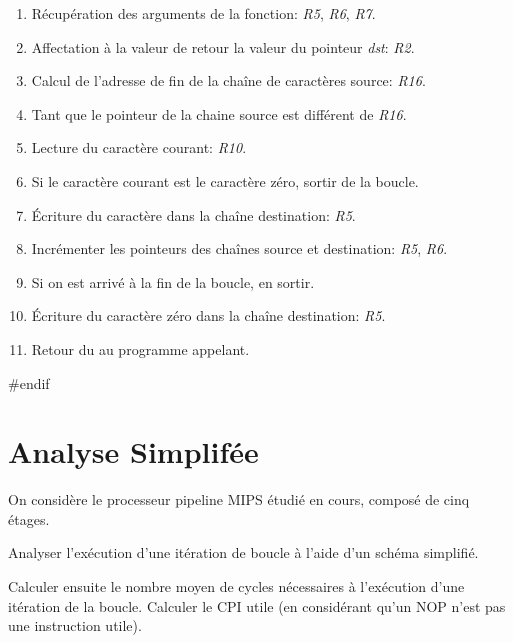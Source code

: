 \begin{correction}
  \begin{enumerate}
    \item
      R\'ecup\'eration des arguments de la fonction: \textit{R5}, \textit{R6},
      \textit{R7}.
    \item
      Affectation \`a la valeur de retour la valeur du pointeur \textit{dst}:
      \textit{R2}.
    \item
      Calcul de l'adresse de fin de la cha\^ine de caract\`eres source:
      \textit{R16}.
    \item
      Tant que le pointeur de la chaine source est diff\'erent de \textit{R16}.
    \item
      Lecture du caract\`ere courant: \textit{R10}.
    \item
      Si le caract\`ere courant est le caract\`ere z\'ero, sortir de la boucle.
    \item
      \'Ecriture du caract\`ere dans la cha\^ine destination: \textit{R5}.
    \item
      Incr\'ementer les pointeurs des cha\^ines source et destination:
      \textit{R5}, \textit{R6}.
    \item
      Si on est arriv\'e \`a la fin de la boucle, en sortir.
    \item
      \'Ecriture du caract\`ere z\'ero dans la cha\^ine destination:
      \textit{R5}.
    \item
      Retour du au programme appelant.
  \end{enumerate}

\end{correction}
#endif

%
%

\section{Analyse Simplif\'ee}

On consid\`ere le processeur pipeline MIPS \'etudi\'e en cours, compos\'e
de cinq \'etages.

Analyser l'ex\'ecution d'une it\'eration de boucle \`a l'aide d'un
sch\'ema simplifi\'e.

Calculer ensuite le nombre moyen de cycles n\'ecessaires \`a
l'ex\'ecution d'une it\'eration de la boucle. Calculer le CPI utile
(en consid\'erant qu'un NOP n'est pas une instruction utile).

